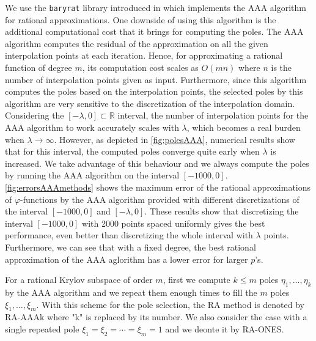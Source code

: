 We use the \texttt{baryrat} library introduced in \cite{hofreither2021BRASIL} which implements
the AAA algorithm for rational approximations. One downside of using this algorithm
is the additional computational cost that it brings for computing the poles.
The AAA algorithm  computes the residual of the approximation on all the given interpolation points at
each iteration. Hence, for approximating a rational function of degree $m$, its computation cost scales
as $O(mn)$ where $n$ is the number of interpolation points given as input.
Furthermore, since this algorithm computes the poles based on the interpolation points, the
selected poles by this algorithm are very sensitive to the discretization of the interpolation domain.
Considering the $[-\lambda, 0] \subset \mathbb{R}$ interval, the number of interpolation
points for the AAA algorithm to work accurately scales with $\lambda$, which becomes a real burden
when $\lambda \to \infty$. However, as depicted in \autoref{fig:polesAAA}, numerical results show that
for this interval, the computed poles converge quite early when $\lambda$ is increased. We take
advantage of this behaviour and we always compute the poles by running the AAA algorithm
on the interval $[-1000, 0]$. \autoref{fig:errorsAAAmethods} shows the maximum error of the rational
approximations of $\varphi$-functions by the AAA algorithm provided with different discretizations
of the interval $[-1000, 0]$ and $[-\lambda, 0]$. These results show that discretizing the interval
$[-1000, 0]$ with 2000 points spaced uniformly gives the best performance, even better than discretizing
the whole interval with $\lambda$ points. Furthermore, we can see that with a fixed degree, the best
rational approximation of the AAA aglorithm has a lower error for larger $p$'s.

For a rational Krylov subspace of order $m$, first we compute $k \le m$ poles $\eta_1, \dots, \eta_k$
by the AAA algorithm and we repeat them enough times to fill the $m$ poles $\xi_1, \dots, \xi_m$.
With this scheme for the pole selection, the RA method is denoted by RA-AAAk where "k" is replaced
by its number.
We also consider the case with a single repeated pole $\xi_1 = \xi_2 = \cdots = \xi_{m} = 1$ and
we deonte it by RA-ONES.


